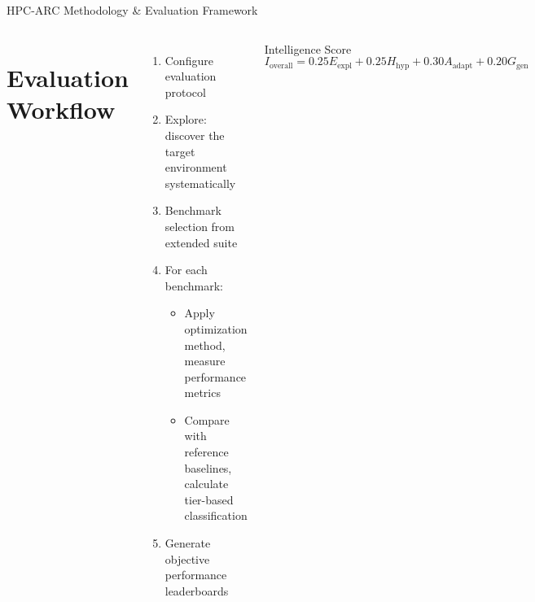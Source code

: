 \documentclass[compress,aspectratio=169]{beamer}
\begin{document}
\begin{frame}{HPC-ARC Methodology \& Evaluation Framework}

    \begin{columns}[t]
            \section*{Evaluation Workflow}
            \scriptsize
            \begin{enumerate}
                \item Configure evaluation protocol
                \item Explore: discover the target environment systematically
                \item Benchmark selection from extended suite
                \item For each benchmark:
                \begin{itemize}
                    \scriptsize
                    \item Apply optimization method, measure performance metrics
                    \item Compare with reference baselines, calculate tier-based classification
                \end{itemize}
                \item Generate objective performance leaderboards
            \end{enumerate}

            \begin{block}{Intelligence Score}
                \scriptsize
                \[
                I_{\text{overall}} = 0.25E_{\text{expl}} + 0.25H_{\text{hyp}} + 0.30A_{\text{adapt}} + 0.20G_{\text{gen}}
                \]
            \end{block}
    \end{columns}


\end{frame}
\end{document}
